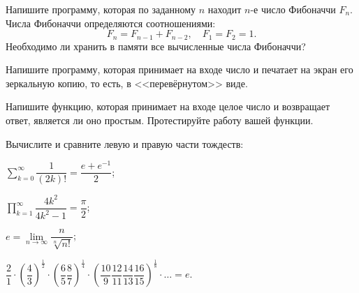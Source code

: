 \ExercisesSection
\begin{exercise}
\item Напишите программу, которая по заданному \(n\) находит \(n\)-е число Фибоначчи \(F_n\). Числа Фибоначчи определяются соотношениями:
\[
F_n = F_{n-1} + F_{n-2},\quad F_1 = F_2 = 1.
\]
Необходимо ли хранить в памяти все вычисленные числа Фибоначчи?

\item Напишите программу, которая принимает на входе число и печатает на экран его зеркальную копию, то есть, в <<перевёрнутом>> виде.

\item Напишите функцию, которая принимает на входе целое число и возвращает ответ, является ли оно простым. Протестируйте работу вашей функции.

\item Вычислите и сравните левую и правую части тождеств:
\begin{flushleft}
    \begin{enumerate*}[label=\arabic*), itemjoin={\qquad}]
        \item \(\sum\limits_{k=0}^{\infty}\dfrac{1}{(2k)!} = \dfrac{e + e^{-1}}{2}\);
        \item \(\prod\limits_{k=1}^{\infty} \dfrac{4k^2}{4k^2 - 1} = \dfrac{\pi}{2}\);
        \item \(e = \lim\limits_{n\to\infty} \dfrac{n}{\sqrt[n]{n!}}\);
    \end{enumerate*}
    \begin{flushright}
        \begin{enumerate*}[label=\arabic*), itemjoin={;\qquad}, resume]
            \item \(\dfrac{2}{1}\cdot
            \left( \dfrac{4}{3} \right)^{\frac{1}{2}}\cdot
            \left( \dfrac{6}{5}\dfrac{8}{7} \right)^{\frac{1}{4}}\cdot
            \left( \dfrac{10}{9}\dfrac{12}{11}\dfrac{14}{13}\dfrac{16}{15} \right)^{\frac{1}{8}}\cdot
            \ldots = e\).
        \end{enumerate*}
    \end{flushright}
\end{flushleft}
\end{exercise}